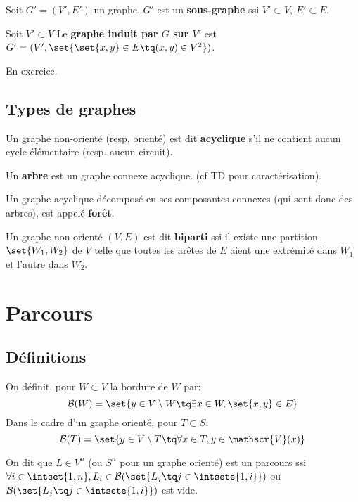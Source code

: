 \documentclass{scrartcl}
\begin{document}

			 Soit $G' = (V',E')$ un graphe.
			$G'$ est un \textbf{sous-graphe} ssi $V' \subset V$, $E' \subset E$.

			 Soit $V' \subset V$
			Le \textbf{graphe induit par $G$ sur $V'$} est $G' = (V', \set{\set{x,y}\in E \tq (x,y) \in V^2})$.

			\begin{demo}
				\item En exercice.
			\end{demo}
	
		\subsection{Types de graphes}
			 Un graphe non-orienté (resp. orienté) est dit \textbf{acyclique} s'il ne contient aucun cycle élémentaire (resp. aucun circuit).

			 Un \textbf{arbre} est un graphe connexe acyclique. (cf TD pour caractérisation).

			 Un graphe acyclique décomposé en ses composantes connexes (qui sont donc des arbres), est appelé \textbf{forêt}.

			 Un graphe non-orienté $(V,E)$ est dit \textbf{biparti} ssi il existe une partition $\set{W_1,W_2}$ de $V$ telle que toutes les arêtes de $E$
			aient une extrémité dans $W_1$ et l'autre dans $W_2$.



	\section{Parcours}
		\subsection{Définitions}
			On définit, pour $W \subset V$ la bordure de $W$ par:
				\[ 
					\mathcal{B}(W) = 
					\set{ y \in V\setminus W \tq \exists x \in W, \set{x,y} \in E}
				\]
			Dans le cadre d'un graphe orienté, pour $T \subset S$:
				\[ 
					\mathcal{B}(T) = 
					\set{ y \in V\setminus T \tq \forall x \in T, y \in \mathscr{V}(x) }
				\]

			On dit que $L\in V^n$ (ou $S^n$ pour un graphe orienté) est un parcours ssi 
			$\forall i \in \intset{1,n}, L_i \in \mathcal{B}(\set{L_j \tq j \in \intsete{1,i}})$ ou $\mathcal{B}(\set{L_j \tq j \in \intsete{1,i}})$ est vide.
			
\end{document}
